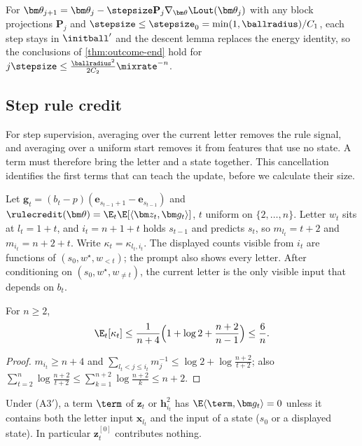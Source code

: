 \begin{remark}
\label{rem:flow}
For $\bm\theta_{j+1}=\bm\theta_j-\stepsize\mathbf P_j\nabla_{\bm\theta}\Lout(\bm\theta_j)$ with any block projections $\mathbf P_j$ and $\stepsize\le\stepsize_0=\min(1,\ballradius)/C_1$, each step stays in
$\initball'$ and the descent lemma replaces the energy identity, so the conclusions of \cref{thm:outcome-end} hold for $j\stepsize\le\frac{\ballradius^2}{2C_2}\mixrate^{-n}$.
\end{remark}

\subsection{Step rule credit}

For step supervision, averaging over the current letter removes the rule signal, and averaging over a uniform start removes it
from features that use no state. A term must therefore bring the letter and a state together. This cancellation identifies the
first terms that can teach the update, before we calculate their size.

Let $\bm g_t=(b_t-p)(\bm e_{s_{t-1}+1}-\bm e_{s_{t-1}})$ and $\rulecredit(\bm\theta)=\E_t\E[\langle\bm z_t,\bm g_t\rangle]$, $t$ uniform on $\{2,\ldots,n\}$. Letter $w_t$ sits at
$l_t=1+t$, and $i_t=n+1+t$ holds $s_{t-1}$ and predicts $s_t$, so $m_{l_t}=t+2$ and $m_{i_t}=n+2+t$. Write $\kappa_t=\kappa_{l_t,i_t}$. The displayed counts visible from $i_t$
are functions of $(s_0,w^\star,w_{<t})$; the prompt also shows every letter. After conditioning on $(s_0,w^\star,w_{\ne t})$, the current letter is the
only visible input that depends on $b_t$.

\begin{lemma}
\label{lem:dilution-average}
For $n\ge2$,
\begin{equation}
 \E_t[\kappa_t]\le\frac{1}{n+4}\Bigl(1+\log2+\frac{n+2}{n-1}\Bigr)\le\frac{6}{n} .
 \label{eq:dilution-avg}
\end{equation}
\end{lemma}

\begin{proof}
$m_{i_t}\ge n+4$ and $\sum_{l_t<j\le i_t}m_j^{-1}\le\log2+\log\frac{n+2}{t+2}$; also $\sum_{t=2}^n\log\frac{n+2}{t+2}\le\sum_{k=1}^{n+2}\log\frac{n+2}{k}\le n+2$.
\end{proof}

\begin{lemma}
\label{lem:rule-sites}
Under (A3$'$), a term $\term$ of $\bm z_t$ or $\bm h^2_{i_t}$ has $\E\langle\term,\bm g_t\rangle=0$ unless it contains both the letter input $\bm x_{l_t}$ and the input of a
state ($s_0$ or a displayed state). In particular $\bm z^{[0]}_t$ contributes nothing.
\end{lemma}

